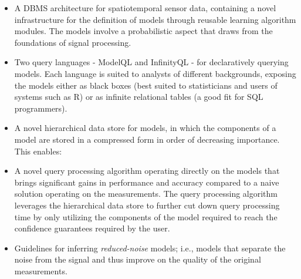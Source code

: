 \begin{itemize}
\item A DBMS architecture for spatiotemporal sensor data, containing a novel infrastructure for the definition of models through reusable learning algorithm modules. The models involve a probabilistic aspect that draws from the foundations of signal processing.
\item Two query languages - ModelQL and InfinityQL - for declaratively querying models. Each language is suited to analysts of different backgrounds, exposing the models either as black boxes (best suited to statisticians and users of systems such as R) or as infinite relational tables (a good fit for SQL programmers).
\item A novel hierarchical data store for models, in which the components of a model are stored in a compressed form in order of decreasing importance. This enables:
\item A novel query processing algorithm operating directly on the models that brings significant gains in performance and accuracy compared to a naive solution operating  on the measurements. The query processing algorithm leverages the hierarchical data store to further cut down query processing time by only utilizing the components of the model required to reach the confidence guarantees required by the user.
\item Guidelines for inferring \emph{reduced-noise} models; i.e., models that separate the noise from the signal and thus improve on the quality of the original measurements.

\end{itemize}






